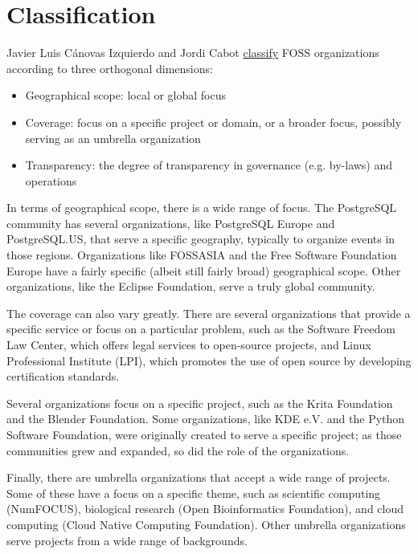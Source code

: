 


\chapter{Classification}

Javier Luis Cánovas Izquierdo and Jordi Cabot \href{https://arxiv.org/pdf/2005.10063.pdf}{classify} FOSS organizations according to three orthogonal dimensions:

\begin{itemize}

\itemsep 0.50em

\item Geographical scope: local or global focus

\item Coverage: focus on a specific project or domain, or a broader focus, possibly serving as an umbrella organization

\item Transparency: the degree of transparency in governance (e.g. by-laws) and operations

\end{itemize}

In terms of geographical scope, there is a wide range of focus.  The PostgreSQL community has several organizations, like PostgreSQL Europe and PostgreSQL.US, that serve a specific geography, typically to organize events in those regions.  Organizations like FOSSASIA and the Free Software Foundation Europe have a fairly specific (albeit still fairly broad) geographical scope.  Other organizations, like the Eclipse Foundation, serve a truly global community.

The coverage can also vary greatly.  There are several organizations that provide a specific service or focus on a particular problem, such as the Software Freedom Law Center, which offers legal services to open-source projects, and Linux Professional Institute (LPI), which promotes the use of open source by developing certification standards.

Several organizations focus on a specific project, such as the Krita Foundation and the Blender Foundation.  Some organizations, like KDE e.V. and the Python Software Foundation, were originally created to serve a specific project; as those communities grew and expanded, so did the role of the organizations.

Finally, there are umbrella organizations that accept a wide range of projects.  Some of these have a focus on a specific theme, such as scientific computing (NumFOCUS), biological research (Open Bioinformatics Foundation), and cloud computing (Cloud Native Computing Foundation).  Other umbrella organizations serve projects from a wide range of backgrounds.


